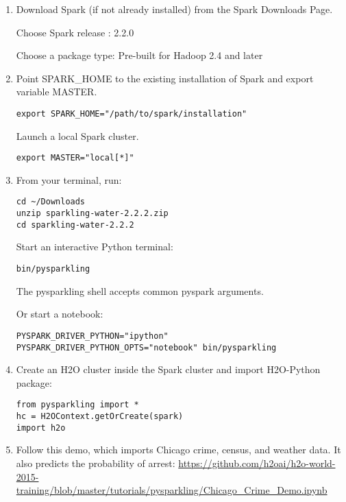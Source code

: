\begin{enumerate}
\item Download Spark (if not already installed) from the Spark Downloads Page.

Choose Spark release : 2.2.0

Choose a package type: Pre-built for Hadoop 2.4 and later

\item Point SPARK\_HOME to the existing installation of Spark and export variable MASTER.

\begin{lstlisting}[style=Bash]
export SPARK_HOME="/path/to/spark/installation" 
\end{lstlisting}

Launch a local Spark cluster.
\begin{lstlisting}[style=Bash]
export MASTER="local[*]"
\end{lstlisting}

\item From your terminal, run:

\begin{lstlisting}[style=Bash]
cd ~/Downloads
unzip sparkling-water-2.2.2.zip
cd sparkling-water-2.2.2
\end{lstlisting}

Start an interactive Python terminal:
\begin{lstlisting}[style=Bash]
bin/pysparkling
\end{lstlisting}
The pysparkling shell accepts common pyspark arguments.

Or start a notebook:
\begin{lstlisting}[style=Bash]
PYSPARK_DRIVER_PYTHON="ipython" PYSPARK_DRIVER_PYTHON_OPTS="notebook" bin/pysparkling
\end{lstlisting}

\item Create an H2O cluster inside the Spark cluster and import H2O-Python package:

\begin{lstlisting}[style=Python]
from pysparkling import *
hc = H2OContext.getOrCreate(spark)
import h2o
\end{lstlisting}

\item Follow this demo, which imports Chicago crime, census, and weather data. It also predicts the probability of arrest:
 \url{https://github.com/h2oai/h2o-world-2015-training/blob/master/tutorials/pysparkling/Chicago_Crime_Demo.ipynb}

\end{enumerate}

